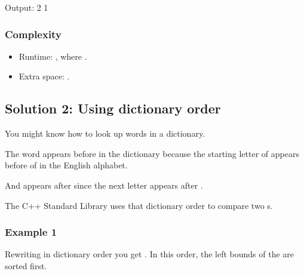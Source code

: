 \documentclass[letterpaper,12pt,english]{book}
\begin{document}
\begin{sphinxVerbatim}[commandchars=\\\{\}]
Output:
2
1
\end{sphinxVerbatim}


\subsubsection{Complexity}
\label{\detokenize{Sorting/04_SORT_1288_Remove_Covered_Intervals:complexity}}\begin{itemize}
\item {} 
\sphinxAtStartPar
Runtime: , where .

\item {} 
\sphinxAtStartPar
Extra space: .

\end{itemize}


\subsection{Solution 2: Using dictionary order}
\label{\detokenize{Sorting/04_SORT_1288_Remove_Covered_Intervals:solution-2-using-dictionary-order}}
\sphinxAtStartPar
You might know how to look up words in a dictionary.

\sphinxAtStartPar
The word  appears before  in the dictionary because the starting letter  of  appears before  of  in the English alphabet.

\sphinxAtStartPar
And  appears after  since the next letter  appears after .

\sphinxAtStartPar
The C++ Standard Library uses that dictionary order to compare two s.


\subsubsection{Example 1}
\label{\detokenize{Sorting/04_SORT_1288_Remove_Covered_Intervals:id2}}
\sphinxAtStartPar
Rewriting  in dictionary order you get . In this order, the left bounds of the  are sorted first.
\end{document}
